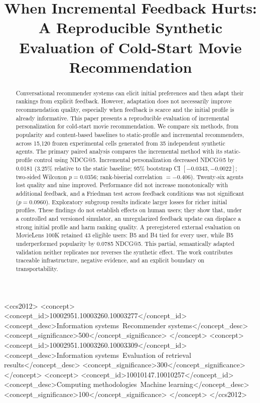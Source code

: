 \documentclass[sigconf,anonymous,review,natbib=false]{acmart}
\begin{document}
\title{When Incremental Feedback Hurts: A Reproducible Synthetic Evaluation of Cold-Start Movie Recommendation}
\renewcommand{\shorttitle}{When Incremental Feedback Hurts}

\begin{abstract}
Conversational recommender systems can elicit initial preferences and then
adapt their rankings from explicit feedback. However, adaptation does not
necessarily improve recommendation quality, especially when feedback is scarce
and the initial profile is already informative. This paper presents a
reproducible evaluation of incremental personalization for cold-start movie
recommendation. We compare six methods, from popularity and content-based
baselines to static-profile and incremental recommenders, across 15,120 frozen
experimental cells generated from 35 independent synthetic agents. The primary
paired analysis compares the incremental method with its static-profile
control using NDCG@5. Incremental personalization decreased NDCG@5 by 0.0181
(3.25\% relative to the static baseline; 95\% bootstrap CI
$[-0.0343,-0.0022]$; two-sided Wilcoxon $p=0.0356$; rank-biserial
correlation $=-0.406$). Twenty-six agents lost quality and nine improved.
Performance did not increase monotonically with additional feedback, and a
Friedman test across feedback conditions was not significant ($p=0.0960$).
Exploratory subgroup results indicate larger losses for richer initial
profiles. These findings do not establish effects on human users; they show
that, under a controlled and versioned simulator, an unregularized feedback
update can displace a strong initial profile and harm ranking quality. A preregistered external evaluation on MovieLens 100K retained 43 eligible
users: B5 and B4 tied for every user, while B5 underperformed popularity by
0.0785 NDCG@5. This partial, semantically adapted validation neither replicates
nor reverses the synthetic effect. The work contributes traceable infrastructure,
negative evidence, and an explicit boundary on transportability.
\end{abstract}

\begin{CCSXML}
<ccs2012>
 <concept>
  <concept_id>10002951.10003260.10003277</concept_id>
  <concept_desc>Information systems~Recommender systems</concept_desc>
  <concept_significance>500</concept_significance>
 </concept>
 <concept>
  <concept_id>10002951.10003260.10003309</concept_id>
  <concept_desc>Information systems~Evaluation of retrieval results</concept_desc>
  <concept_significance>300</concept_significance>
 </concept>
 <concept>
  <concept_id>10010147.10010257</concept_id>
  <concept_desc>Computing methodologies~Machine learning</concept_desc>
  <concept_significance>100</concept_significance>
 </concept>
</ccs2012>
\end{CCSXML}
\end{document}
